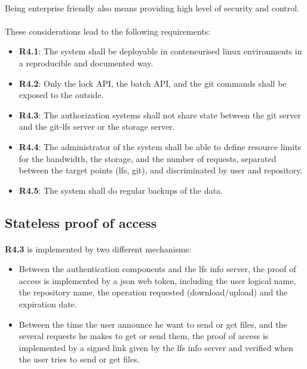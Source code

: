 \paragraph{}
Being enterprise friendly also means providing high level of security and control. 

\paragraph{}
These considerations lead to the following requirements:

\begin{itemize}
    \item \textbf{R4.1}: The system shall be deployable in conteneurised linux environments in a reproducible and documented way.  
    \item \textbf{R4.2}: Only the lock API, the batch API, and the git commands shall be exposed to the outside.
    \item \textbf{R4.3}: The authorization systems shall not share state between the git server and the git-lfs server or the storage server.
    \item \textbf{R4.4}: The administrator of the system shall be able to define resource limits for the bandwidth, the storage, and the number of requests, separated between the target points (lfs, git), and discriminated by user and repository.
    \item \textbf{R4.5}: The system shall do regular backups of the data.
\end{itemize}

\subsection{Stateless proof of access}

\paragraph{}
\textbf{R4.3} is implemented by two different mechanisms:

\begin{itemize}
    \item Between the authentication components and the lfs info server, the proof of access is implemented by a json web token, including the user logical name, the repository name, the operation requested (download/upload) and the expiration date.
    \item Between the time the user announce he want to send or get files, and the several requests he makes to get or send them, the proof of access is implemented by a signed link given by the lfs info server and verified when the user tries to send or get files.
\end{itemize}


